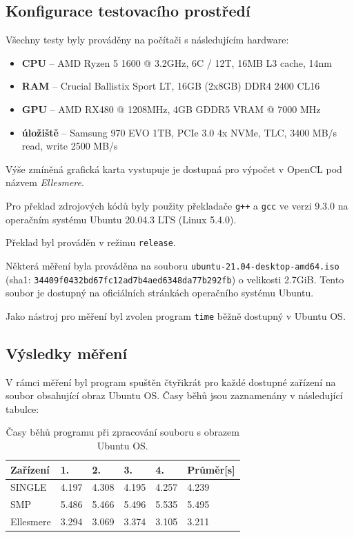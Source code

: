 \documentclass[12pt, a4paper]{article}
\begin{document}
\subsection{Konfigurace testovacího prostředí}
Všechny testy byly prováděny na počítači s následujícím hardware:

\begin{itemize}
    \item \textbf{CPU} -- AMD Ryzen 5 1600 @ 3.2GHz, 6C / 12T, 16MB L3 cache, 14nm 
    \item \textbf{RAM} -- Crucial Ballistix Sport LT, 16GB (2x8GB) DDR4 2400 CL16
    \item \textbf{GPU} -- AMD RX480 @ 1208MHz, 4GB GDDR5 VRAM @ 7000 MHz
    \item \textbf{úložiště} -- Samsung 970 EVO 1TB, PCIe 3.0 4x NVMe, TLC, 3400 MB/s read, write 2500 MB/s
\end{itemize}

Výše zmíněná grafická karta vystupuje je dostupná pro výpočet v OpenCL pod názvem \textit{Ellesmere}.

Pro překlad zdrojových kódů byly použity překladače \texttt{g++} a \texttt{gcc} ve verzi 9.3.0 na operačním systému Ubuntu 20.04.3 LTS (Linux 5.4.0).

Překlad byl prováděn v režimu \texttt{release}.  

Některá měření byla prováděna na souboru \texttt{ubuntu-21.04-desktop-amd64.iso} (sha1: \texttt{34409f0432bd67fc12ad7b4aed6348da77b292fb}) o velikosti 2.7GiB. Tento soubor je dostupný na oficiálních stránkách operačního systému Ubuntu.

Jako nástroj pro měření byl zvolen program \texttt{time} běžně dostupný v Ubuntu OS.

\subsection{Výsledky měření}

V rámci měření byl program spuštěn čtyřikrát pro každé dostupné zařízení na soubor obsahující obraz Ubuntu OS.
Časy běhů jsou zaznamenány v následující tabulce: 

\begin{table}[!ht]
    \begin{center}
        \begin{tabular}{ | m{6.5em} || m{1.5cm}| m{1.5cm} | m{1.5cm} | m{1.5cm} || m{1.7cm} |} 
             \hline
             Zařízení & 1. & 2. & 3. & 4. & Průměr[s] \\ 

             \hline
             \hline
              SINGLE &  4.197 & 4.308 & 4.195 & 4.257 & 4.239 \\  
              SMP & 5.486 & 5.466 & 5.496 & 5.535 & 5.495 \\
              Ellesmere & 3.294 & 3.069 & 3.374 & 3.105 & 3.211 \\

             \hline
        \end{tabular}
    \end{center}
    \caption{Časy běhů programu při zpracování souboru s obrazem Ubuntu OS.}
\end{table}
\end{document}
